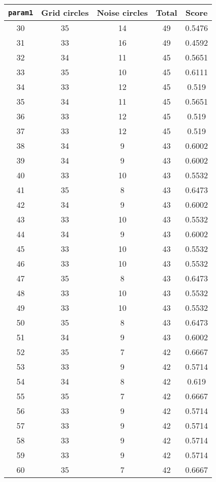 \documentclass[letterpaper, 12pt]{article}
\begin{document}
\begin{longtable}{|c|c|c|c|c|}
\hline
\textbf{\texttt{param1}} & \textbf{Grid circles} & \textbf{Noise circles} & \textbf{Total} & \textbf{Score} \\
\hline
30 & 35 & 14 & 49 & 0.5476 \\
\hline
31 & 33 & 16 & 49 & 0.4592 \\
\hline
32 & 34 & 11 & 45 & 0.5651 \\
\hline
33 & 35 & 10 & 45 & 0.6111 \\
\hline
34 & 33 & 12 & 45 & 0.519 \\
\hline
35 & 34 & 11 & 45 & 0.5651 \\
\hline
36 & 33 & 12 & 45 & 0.519 \\
\hline
37 & 33 & 12 & 45 & 0.519 \\
\hline
38 & 34 & 9 & 43 & 0.6002 \\
\hline
39 & 34 & 9 & 43 & 0.6002 \\
\hline
40 & 33 & 10 & 43 & 0.5532 \\
\hline
41 & 35 & 8 & 43 & 0.6473 \\
\hline
42 & 34 & 9 & 43 & 0.6002 \\
\hline
43 & 33 & 10 & 43 & 0.5532 \\
\hline
44 & 34 & 9 & 43 & 0.6002 \\
\hline
45 & 33 & 10 & 43 & 0.5532 \\
\hline
46 & 33 & 10 & 43 & 0.5532 \\
\hline
47 & 35 & 8 & 43 & 0.6473 \\
\hline
48 & 33 & 10 & 43 & 0.5532 \\
\hline
49 & 33 & 10 & 43 & 0.5532 \\
\hline
50 & 35 & 8 & 43 & 0.6473 \\
\hline
51 & 34 & 9 & 43 & 0.6002 \\
\hline
52 & 35 & 7 & 42 & 0.6667 \\
\hline
53 & 33 & 9 & 42 & 0.5714 \\
\hline
54 & 34 & 8 & 42 & 0.619 \\
\hline
55 & 35 & 7 & 42 & 0.6667 \\
\hline
56 & 33 & 9 & 42 & 0.5714 \\
\hline
57 & 33 & 9 & 42 & 0.5714 \\
\hline
58 & 33 & 9 & 42 & 0.5714 \\
\hline
59 & 33 & 9 & 42 & 0.5714 \\
\hline
60 & 35 & 7 & 42 & 0.6667 \\
\hline

\end{longtable}
\end{document}
